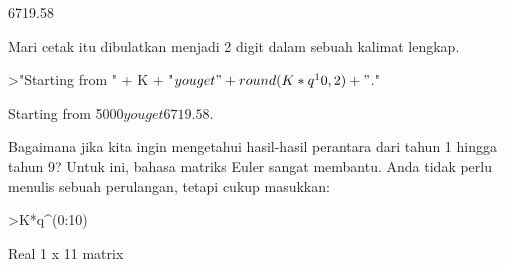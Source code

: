 \documentclass[12pt,arial,letterpaper]{book}
\begin{document}
\begin{eulercomment}
\begin{eulercomment}
\begin{eulercomment}
\begin{eulercomment}
\begin{eulercomment}
\begin{eulercomment}
\begin{eulercomment}
\begin{eulercomment}
\begin{eulercomment}
\begin{eulercomment}
\begin{euleroutput}
      6719.58 
\end{euleroutput}
\begin{eulercomment}
Mari cetak itu dibulatkan menjadi 2 digit dalam sebuah kalimat
lengkap.
\end{eulercomment}
\begin{eulerprompt}
>"Starting from " + K + "$ you get " + round(K*q^10,2) + "$."
\end{eulerprompt}
\begin{euleroutput}
  Starting from 5000$ you get 6719.58$.
\end{euleroutput}
\begin{eulercomment}
Bagaimana jika kita ingin mengetahui hasil-hasil perantara dari tahun
1 hingga tahun 9? Untuk ini, bahasa matriks Euler sangat membantu.
Anda tidak perlu menulis sebuah perulangan, tetapi cukup masukkan:
\end{eulercomment}
\begin{eulerprompt}
>K*q^(0:10)
\end{eulerprompt}
\begin{euleroutput}
  Real 1 x 11 matrix
  

\end{euleroutput}
\end{eulercomment}
\end{eulercomment}
\end{eulercomment}
\end{eulercomment}
\end{eulercomment}
\end{eulercomment}
\end{eulercomment}
\end{eulercomment}
\end{eulercomment}
\end{eulercomment}
\end{document}
